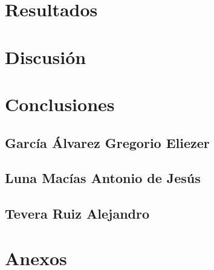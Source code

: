 \documentclass[journal]{IEEEtran}
\begin{document}
    \section{Resultados}
    
    \blindtext[0]

    \section{Discusión}

    \blindtext[0]

    \section{Conclusiones}

    \subsection{García Álvarez Gregorio Eliezer}
    \blindtext[0]
    \subsection{Luna Macías Antonio de Jesús}
    \blindtext[0]
    \subsection{Tevera Ruiz Alejandro}
    \blindtext[0]
    \section{Anexos}
    \blindtext[0]
\end{document}
